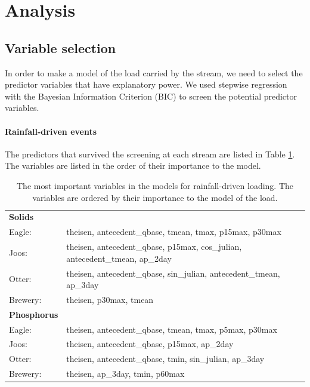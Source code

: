 \documentclass[12pt]{article}
\begin{document}
\section{Analysis}

\subsection{Variable selection}
In order to make a model of the load carried by the stream, we need to select the predictor variables that have explanatory power. We used stepwise regression with the Bayesian Information Criterion (BIC) to screen the potential predictor variables.

\paragraph{Rainfall-driven events} The predictors that survived the screening at each stream are listed in Table \ref{nosnow_predictor_list}. The variables are listed in the order of their importance to the model.\\

\begin{table}[h!]\small
    \begin{center}
    \begin{tabular}{ll}
        \textbf{Solids} & \\
        \hspace{5mm} Eagle: & theisen, antecedent\_qbase, tmean, tmax, p15max, p30max\\
        \hspace{5mm} Joos: & theisen, antecedent\_qbase, p15max, cos\_julian, antecedent\_tmean, ap\_2day\\
        \hspace{5mm} Otter: & theisen, antecedent\_qbase, sin\_julian, antecedent\_tmean, ap\_3day\\
        \hspace{5mm} Brewery: & theisen, p30max, tmean
    \vspace{2mm}\\
        \textbf{Phosphorus} & \\
        \hspace{5mm} Eagle: & theisen, antecedent\_qbase, tmean, tmax, p5max, p30max\\
        \hspace{5mm} Joos: & theisen, antecedent\_qbase, p15max, ap\_2day\\
        \hspace{5mm} Otter: & theisen, antecedent\_qbase, tmin, sin\_julian, ap\_3day\\
        \hspace{5mm} Brewery: & theisen, ap\_3day, tmin, p60max\\
    \end{tabular}
    \caption{The most important variables in the models for rainfall-driven loading. The variables are ordered by their importance to the model of the load. \label{nosnow_predictor_list}}
    \end{center}
\end{table}
\end{document}
